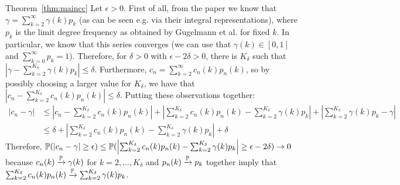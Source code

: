 \begin{proofof}{Theorem~\ref{thm:maincc}}
Let $\epsilon >0$.
First of all, from the paper we know that $\gamma = \sum_{k=2}^\infty \gamma(k)p_k$ (as can be seen e.g. via their integral representations), where $p_k$ is the limit degree frequency as obtained by Gugelmann et al. for fixed $k$. In particular, we know that this series converges (we can use that $\gamma(k)\in [0,1]$ and $\sum_{k=0}^\infty p_k = 1$). Therefore, for $\delta >0$ with $\epsilon-2\delta>0$, there is $K_\delta$ such that $|\gamma - \sum_{k=2}^{K_\delta} \gamma(k)p_k| \leq \delta$. Furthermore, $c_n = \sum_{k=2}^\infty c_n(k)p_n(k)$, so by possibly choosing a larger value for $K_\delta$, we have that $|c_n-\sum_{k=2}^{K_\delta} c_n(k)p_n(k)| \leq \delta$.
Putting these observations together:
\begin{align*}
|c_n-\gamma| &\leq \left|c_n-\sum_{k=2}^{K_\delta}c_n(k)p_n(k)\right|+\left|\sum_{k=2}^{K_\delta} c_n(k)p_n(k) -\sum_{k=2}^{K_\delta} \gamma(k)p_k\right| +\left|\sum_{k=2}^{K_\delta} \gamma(k)p_k-\gamma\right| \\
 &\leq \delta +\left|\sum_{k=2}^{K_\delta} c_n(k)p_n(k) -\sum_{k=2}^{K_\delta} \gamma(k)p_k\right| +\delta 
\end{align*}
Therefore, $\mathbb{P}(|c_n-\gamma|\geq \epsilon) \leq \mathbb{P}(\left|\sum_{k=2}^{K_\delta} c_n(k)p_n(k) -\sum_{k=2}^{K_\delta} \gamma(k)p_k\right| \geq \epsilon - 2\delta) \rightarrow 0$ because $c_n(k) \xrightarrow{\mathbb{P}} \gamma(k)$ for $k=2,\dots,K_\delta$ and $p_n(k) \xrightarrow{\mathbb{P}} p_k$ together imply that $\sum_{k=2}^{K_\delta} c_n(k)p_n(k) \xrightarrow{\mathbb{P}} \sum_{k=2}^{K_\delta} \gamma(k) p_k$. %
\end{proofof}



